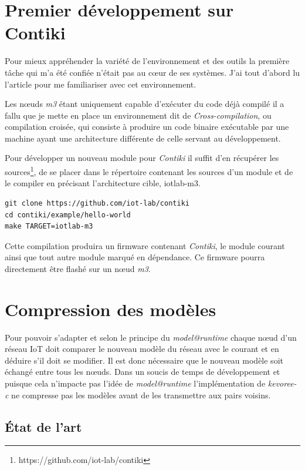 \section{Premier développement sur Contiki}
Pour mieux appréhender la variété de l'environnement et des outils la première tâche qui m'a été confiée n'était pas au cœur de ses systèmes. J'ai tout d'abord lu l'article \citep{acostapadilla} pour me familiariser avec cet environnement. 

Les nœuds \emph{m3} étant uniquement capable d'exécuter du code déjà compilé il a fallu que je mette en place un environnement dit de \emph{Cross-compilation}, ou compilation croisée, qui consiste à produire un code binaire exécutable par une machine ayant une architecture différente de celle servant au développement.

Pour développer un nouveau module pour \emph{Contiki} il suffit d'en récupérer les sources\footnote{https://github.com/iot-lab/contiki}, de se placer dans le répertoire contenant les sources d'un module et de le compiler en précisant l'architecture cible, iotlab-m3.

\lstset{language=bash, captionpos=b, caption=Résumé des étapes de compilation}
\begin{lstlisting}[frame=single]
git clone https://github.com/iot-lab/contiki
cd contiki/example/hello-world
make TARGET=iotlab-m3
\end{lstlisting}

Cette compilation produira un firmware contenant \emph{Contiki}, le module courant ainsi que tout autre module marqué en dépendance. Ce firmware pourra directement être flashé sur un nœud \emph{m3}.

\section{Compression des modèles}

Pour pouvoir s'adapter et selon le principe du \emph{model@runtime} chaque nœud d'un réseau IoT doit comparer le nouveau modèle du réseau avec le courant et en déduire s'il doit se modifier. Il est donc nécessaire que le nouveau modèle soit échangé entre tous les nœuds. Dans un soucis de temps de développement et puisque cela n'impacte pas l'idée de \emph{model@runtime} l'implémentation de \emph{kevoree-c} ne compresse pas les modèles avant de les transmettre aux pairs voisins.

\subsection{État de l'art}

